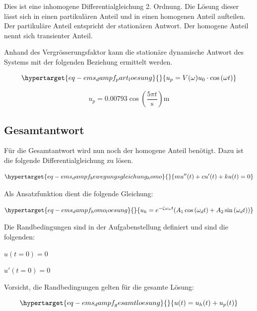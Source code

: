 \documentclass[
  letterpaper,
  DIV=11]{scrreprt}
\begin{document}
Dies ist eine inhomogene Differentialgleichung 2. Ordnung. Die Lösung
dieser lässt sich in einen partikulären Anteil und in einen homogenen
Anteil aufteilen. Der partikuläre Anteil entspricht der stationären
Antwort. Der homogene Anteil nennt sich transienter Anteil.

Anhand des Vergrösserungsfaktor kann die stationäre dynamische Antwort
des Systems mit der folgenden Beziehung ermittelt werden.

\begin{equation}\protect\hypertarget{eq-ems_dampf_part_loesung}{}{
u_p = V(\omega)u_0 \cdot \cos{(\omega t)}
}\label{eq-ems_dampf_part_loesung}\end{equation}

\begin{equation}u_{p} = 0.00793 \cos{\left(\frac{5 \pi t}{\text{s}} \right)} \text{m}\end{equation}

\hypertarget{gesamtantwort-1}{%
\subsection{Gesamtantwort}\label{gesamtantwort-1}}

Für die Gesamtantwort wird nun noch der homogene Anteil benötigt. Dazu
ist die folgende Differentialgleichung zu lösen.

\begin{equation}\protect\hypertarget{eq-ems_dampf_bewegungsgleichung_homo}{}{
mu''(t)+ cu'(t) + ku(t) = 0
}\label{eq-ems_dampf_bewegungsgleichung_homo}\end{equation}

Als Ansatzfunktion dient die folgende Gleichung:

\begin{equation}\protect\hypertarget{eq-ems_dampf_homo_loesung}{}{
u_h = e^{-\zeta \omega_n t} (A_1\cos{(\omega_d t)} + A_2 \sin{(\omega_d t)})
}\label{eq-ems_dampf_homo_loesung}\end{equation}

Die Randbedingungen sind in der Aufgabenstellung definiert und sind die
folgenden:

\(u(t=0)=0\)

\(u'(t=0)=0\)

Vorsicht, die Randbedingungen gelten für die gesamte Lösung:

\begin{equation}\protect\hypertarget{eq-ems_dampf_gesamtloesung}{}{
u(t) = u_h(t) + u_p(t)
}\label{eq-ems_dampf_gesamtloesung}\end{equation}
\end{document}
